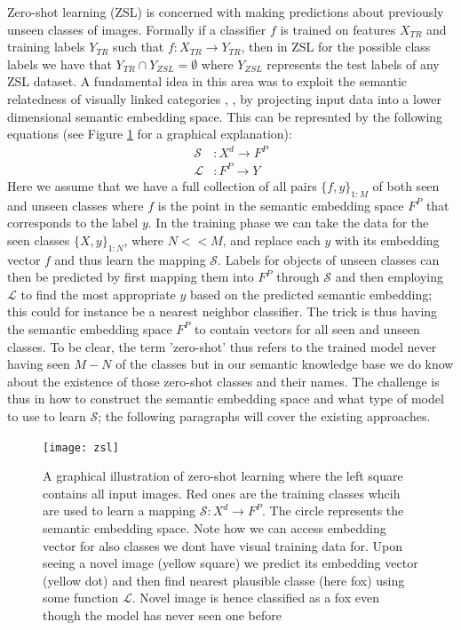 \documentclass[12pt]{report}
\begin{document}
Zero-shot learning (ZSL) \cite{Palatucci2009} is concerned with making predictions about previously unseen classes of images. Formally if a classifier $f$ is trained on features $X_{TR}$ and training labels $Y_{TR}$ such that $f:X_{TR} \rightarrow Y_{TR}$, then in ZSL for the possible class labels we have that $Y_{TR} \cap Y_{ZSL} = \emptyset$ where $Y_{ZSL}$ represents the test labels of any ZSL dataset. A fundamental idea in this area was to exploit the semantic relatedness of visually linked categories \cite{Monay2004}, \cite{Weston2010}, \cite{Palatucci2009} by projecting input data into a lower dimensional semantic embedding space. This can be represnted by the following equations \cite{Palatucci2009} (see Figure \ref{fig:zsl} for a graphical explanation):
\begin{align} \label{zsl_eq}
  \mathcal{S} &: X^d \rightarrow F^P \\
  \mathcal{L} &: F^P \rightarrow Y
\end{align}
Here we assume that we have a full collection of all pairs $\{f, y\}_{1:M}$ of both seen and unseen classes where $f$ is the point in the semantic embedding space $F^P$ that corresponds to the label $y$. In the training phase we can take the data for the seen classes $\{X, y\}_{1:N}$, where $N<<M$, and replace each $y$ with its embedding vector $f$ and thus learn the mapping $\mathcal{S}$. Labels for objects of unseen classes can then be predicted by first mapping them into $F^P$ through $\mathcal{S}$ and then employing $\mathcal{L}$ to find the most appropriate $y$ based on the predicted semantic embedding; this could for instance be a nearest neighbor classifier. The trick is thus having the semantic embedding space $F^P$ to contain vectors for all seen and unseen classes. To be clear, the term 'zero-shot' thus refers to the trained model never having seen $M-N$ of the classes but in our semantic knowledge base we do know about the existence of those zero-shot classes and their names. The challenge is thus in how to construct the semantic embedding space and what type of model to use to learn $\mathcal{S}$; the following paragraphs will cover the existing approaches.

\begin{figure}
  \centering
	\texttt{[image: zsl]}
	\caption{A graphical illustration of zero-shot learning where the left square contains all input images. Red ones are the training classes whcih are used to learn a mapping $\mathcal{S}:X^d \rightarrow F^P$. The circle represents the semantic embedding space. Note how we can access embedding vector for also classes we dont have visual training data for. Upon seeing a novel image (yellow square) we predict its embedding vector (yellow dot) and then find nearest plausible classe (here fox) using some function $\mathcal{L}$. Novel image is hence classified as a fox even though the model has never seen one before}
	\label{fig:zsl}
\end{figure}
\end{document}
